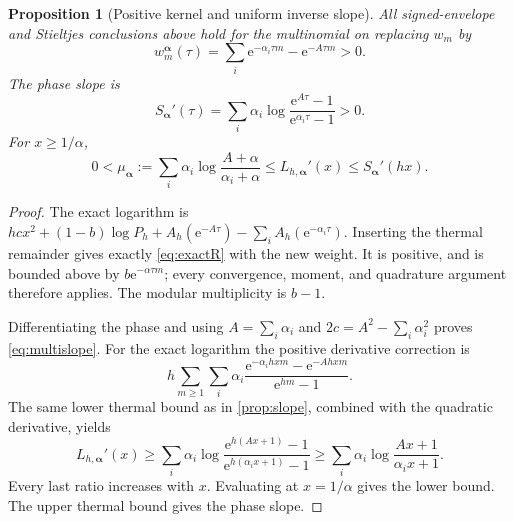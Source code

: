 \documentclass[11pt,a4paper]{article}
\newcommand{\ee}{\mathrm e}
\numberwithin{equation}{section}
\theoremstyle{plain}
\newtheorem{proposition}[theorem]{Proposition}
\theoremstyle{definition}
\theoremstyle{remark}
\begin{document}
\begin{proposition}[Positive kernel and uniform inverse slope]
\label{prop:multikernel}
All signed-envelope and Stieltjes conclusions above hold for the multinomial
on replacing $w_m$ by
\begin{equation}
 w_m^{\boldsymbol\alpha}(\tau)=\sum_i\ee^{-\alpha_i\tau m}
                                   -\ee^{-A\tau m}>0.
 \label{eq:multiw}
\end{equation}
The phase slope is
\begin{equation}
 S_{\boldsymbol\alpha}'(\tau)=
 \sum_i\alpha_i\log\frac{\ee^{A\tau}-1}{\ee^{\alpha_i\tau}-1}>0.
 \label{eq:multislope}
\end{equation}
For $x\ge1/\alpha$,
\begin{equation}
 0<\mu_{\boldsymbol\alpha}:=
   \sum_i\alpha_i\log\frac{A+\alpha}{\alpha_i+\alpha}
 \le L_{h,\boldsymbol\alpha}'(x)
 \le S_{\boldsymbol\alpha}'(hx).
 \label{eq:multislopebound}
\end{equation}
\end{proposition}
\begin{proof}
The exact logarithm is
$hc x^2+(1-b)\log P_h+A_h(\ee^{-A\tau})-
\sum_iA_h(\ee^{-\alpha_i\tau})$. Inserting the thermal remainder gives
exactly \eqref{eq:exactR} with the new weight. It is positive, and is bounded
above by $b\ee^{-\alpha\tau m}$; every convergence, moment, and quadrature
argument therefore applies. The modular multiplicity is $b-1$.

Differentiating the phase and using $A=\sum_i\alpha_i$ and
$2c=A^2-\sum_i\alpha_i^2$ proves \eqref{eq:multislope}. For the exact
logarithm the positive derivative correction is
\[
 h\sum_{m\ge1}\sum_i\alpha_i
  \frac{\ee^{-\alpha_i hxm}-\ee^{-Ahxm}}{\ee^{hm}-1}.
\]
The same lower thermal bound as in \cref{prop:slope}, combined with the
quadratic derivative, yields
\[
 L_{h,\boldsymbol\alpha}'(x)
 \ge\sum_i\alpha_i\log
       \frac{\ee^{h(Ax+1)}-1}{\ee^{h(\alpha_i x+1)}-1}
 \ge\sum_i\alpha_i\log\frac{Ax+1}{\alpha_i x+1}.
\]
Every last ratio increases with $x$. Evaluating at $x=1/\alpha$ gives the
lower bound. The upper thermal bound gives the phase slope.
\end{proof}
\end{document}
